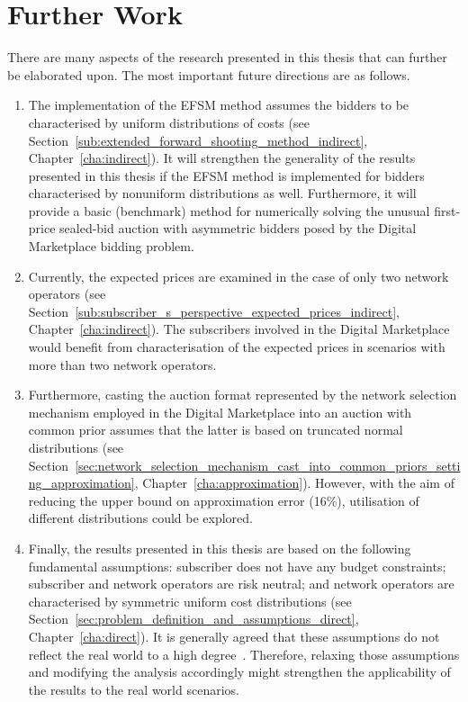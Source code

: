 \section{Further Work} %
\label{sec:further_work_conclusions}
There are many aspects of the research presented in this thesis that can further be elaborated upon. The most important future directions are as follows.
\begin{enumerate}
\item The implementation of the EFSM method assumes the bidders to be characterised by uniform distributions of costs (see Section~\ref{sub:extended_forward_shooting_method_indirect}, Chapter~\ref{cha:indirect}). It will strengthen the generality of the results presented in this thesis if the EFSM method is implemented for bidders characterised by nonuniform distributions as well. Furthermore, it will provide a basic (benchmark) method for numerically solving the unusual first-price sealed-bid auction with asymmetric bidders posed by the Digital Marketplace bidding problem.
\item Currently, the expected prices are examined in the case of only two network operators (see Section~\ref{sub:subscriber_s_perspective_expected_prices_indirect}, Chapter~\ref{cha:indirect}). The subscribers involved in the Digital Marketplace would benefit from characterisation of the expected prices in scenarios with more than two network operators.
\item Furthermore, casting the auction format represented by the network selection mechanism employed in the Digital Marketplace into an auction with common prior assumes that the latter is based on truncated normal distributions (see Section~\ref{sec:network_selection_mechanism_cast_into_common_priors_setting_approximation}, Chapter~\ref{cha:approximation}). However, with the aim of reducing the upper bound on approximation error (16\%), utilisation of different distributions could be explored.
\item Finally, the results presented in this thesis are based on the following fundamental assumptions: subscriber does not have any budget constraints; subscriber and network operators are risk neutral; and network operators are characterised by symmetric uniform cost distributions (see Section~\ref{sec:problem_definition_and_assumptions_direct}, Chapter~\ref{cha:direct}). It is generally agreed that these assumptions do not reflect the real world to a high degree~\cite{Krishna10}. Therefore, relaxing those assumptions and modifying the analysis accordingly might strengthen the applicability of the results to the real world scenarios.
\end{enumerate}
